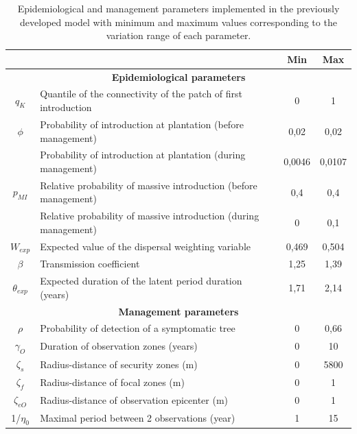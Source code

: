 \begin{table}[htbp]
	\centering
	\caption{Epidemiological and management parameters implemented in the previously developed model  with minimum and maximum values corresponding to the variation range of each parameter.}
	\begin{tabular}{|c|p{33.785em}|c|c|}
		\cmidrule{3-4}    \multicolumn{1}{c}{} & \multicolumn{1}{c|}{} & \textbf{Min} & \textbf{Max} \\
		\midrule
		\multicolumn{4}{|c|}{\textbf{Epidemiological parameters}} \\
		\midrule
		$q_{K}$    & Quantile of the connectivity of the patch of first introduction & 0     & 1 \\
		\midrule
		$\phi$ & Probability of introduction at plantation (before management) & 0,02  & 0,02 \\
		\cmidrule{2-4}          & Probability of introduction at plantation (during management) & 0,0046 & 0,0107 \\
		\midrule
		$p_{MI}$ & Relative probability of massive introduction (before management) & 0,4   & 0,4 \\
		\cmidrule{2-4}          & Relative probability of massive introduction  (during management) & 0     & 0,1 \\
		\midrule
		$W_{exp}$  & Expected value of the dispersal weighting variable & 0,469 & 0,504 \\
		\midrule
		$\beta$     & Transmission coefficient & 1,25  & 1,39 \\
		\midrule
		$\theta_{exp}$  & Expected duration of the latent period duration (years) & 1,71  & 2,14 \\
		\midrule
		\multicolumn{4}{|c|}{\textbf{Management parameters}} \\
		\midrule
		$\rho$    & Probability of detection of a symptomatic tree & 0     & 0,66 \\
		\midrule
		$\gamma_{O}$    & Duration of observation zones (years) & 0     & 10 \\
		\midrule
		$\zeta_{s}$   & Radius-distance of security zones (m) & 0     & 5800 \\
		\midrule
		$\zeta_{f}$  & Radius-distance of focal zones (m) & 0     & 1 \\
		\midrule
		$\zeta_{eO}$ & Radius-distance of observation epicenter (m) & 0     & 1 \\
		\midrule
		1/$\eta_{0}$  & Maximal period between 2 observations (year) & 1     & 15 \\

\end{tabular}
\end{table}
